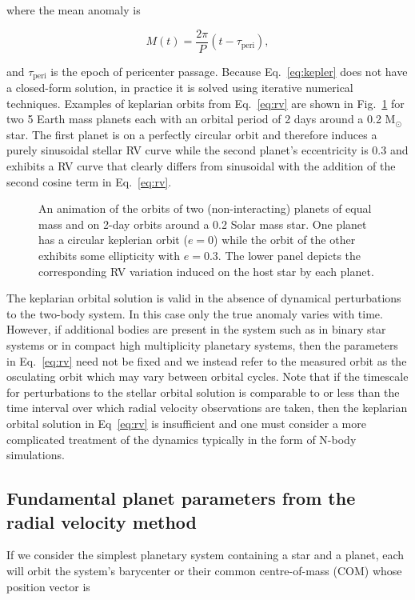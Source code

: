 \noindent where the mean anomaly is

\begin{equation}
M(t) = \frac{2\pi}{P} (t-\tau_{\mathrm{peri}}), 
\end{equation}

\noindent and $\tau_{\mathrm{peri}}$ is the epoch of 
pericenter passage. Because Eq.~\ref{eq:kepler} does not have a closed-form 
solution, in practice it is solved using iterative numerical techniques. 
Examples of keplarian orbits from Eq.~\ref{eq:rv} are shown in Fig.~\ref{fig:rv} 
for two 5 Earth mass planets each with an orbital period of 2 days around a 0.2 M$_{\odot}$ 
star. The first planet is on a perfectly circular orbit and therefore induces a purely
sinusoidal stellar RV curve while the second planet's eccentricity is 0.3 and exhibits a
RV curve that clearly differs from sinusoidal with the addition of the second cosine term in
Eq.~\ref{eq:rv}. \\


\begin{figure}
  \centering
  \caption{An animation of the orbits of two (non-interacting) planets of equal
    mass and on 2-day orbits around a 0.2 Solar mass star. One planet has a circular
    keplerian orbit ($e=0$) while the orbit of the other exhibits some ellipticity with
    $e=0.3$. The lower panel depicts the corresponding RV variation induced on the host star
    by each planet.}
  \label{fig:rv}
\end{figure}

The keplarian orbital solution is valid in the absence of dynamical 
perturbations to the two-body system. In this case only the true anomaly varies with 
time. However, if additional bodies are present in the system such as in binary star 
systems or in compact high multiplicity planetary systems, then the parameters in 
Eq.~\ref{eq:rv} need not be fixed and we instead refer to the measured orbit as the 
osculating orbit which may vary between orbital cycles. Note that if the timescale 
for perturbations to the stellar orbital solution is comparable to or less than the 
time interval over which radial velocity observations are taken, then the keplarian 
orbital solution in Eq~\ref{eq:rv} is insufficient and one must consider a more
complicated treatment of the dynamics typically in the form of N-body simulations.


\subsection{Fundamental planet parameters from the radial velocity method} \label{sect:K}
If we consider the simplest planetary system containing a star and a planet, each will 
orbit the system's barycenter or their common centre-of-mass (COM) whose position vector
is


